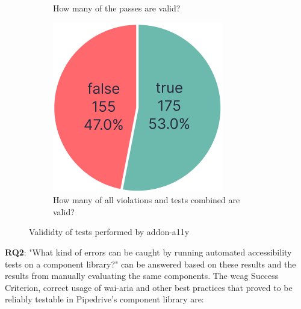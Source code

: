 \documentclass{master_thesis}
\begin{document}
\begin{figure}[ht]
\begin{subfigure}{0.3\textwidth}
	\caption{How many of the passes are valid?}
	\label{fig:checks-validity-passed}
	\end{subfigure}
	\hspace{0.03\textwidth}
	\begin{subfigure}{0.3\textwidth}
	\includegraphics[width=\textwidth]{img/violations+passes.png}
	\caption{How many of all violations and tests combined are valid?}
	\label{fig:checks-validity-all}
	\end{subfigure}
\caption{Valididty of tests performed by addon-a11y}
\label{fig:checks-validity}
\end{figure}

\textbf{RQ2}: "What kind of errors can be caught by running automated accessibility tests on a component library?" can be answered based on these results and the results from manually evaluating the same components. The \ac{wcag} Success Criterion, correct usage of \ac{wai-aria} and other best practices that proved to be reliably testable in Pipedrive's component library are:
\end{document}
